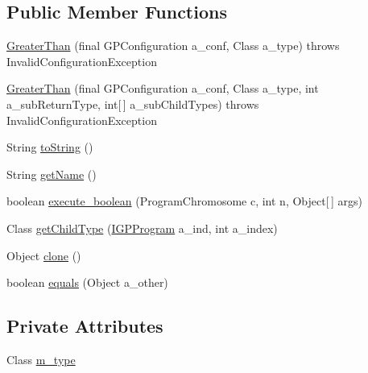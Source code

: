 \subsection*{Public Member Functions}
\begin{DoxyCompactItemize}
\item 
\hyperlink{classorg_1_1jgap_1_1gp_1_1function_1_1_greater_than_a917097bf9614d97706897533887ff9f0}{Greater\-Than} (final G\-P\-Configuration a\-\_\-conf, Class a\-\_\-type)  throws Invalid\-Configuration\-Exception 
\item 
\hyperlink{classorg_1_1jgap_1_1gp_1_1function_1_1_greater_than_a6901273979f00176acda4f5981f33b09}{Greater\-Than} (final G\-P\-Configuration a\-\_\-conf, Class a\-\_\-type, int a\-\_\-sub\-Return\-Type, int\mbox{[}$\,$\mbox{]} a\-\_\-sub\-Child\-Types)  throws Invalid\-Configuration\-Exception 
\item 
String \hyperlink{classorg_1_1jgap_1_1gp_1_1function_1_1_greater_than_a93a31532b674a66239530067abf457ce}{to\-String} ()
\item 
String \hyperlink{classorg_1_1jgap_1_1gp_1_1function_1_1_greater_than_adf5de34aea7c8dac2dfa33c187d632aa}{get\-Name} ()
\item 
boolean \hyperlink{classorg_1_1jgap_1_1gp_1_1function_1_1_greater_than_a30eb87fb0cf173cf8d980e80a21c415f}{execute\-\_\-boolean} (Program\-Chromosome c, int n, Object\mbox{[}$\,$\mbox{]} args)
\item 
Class \hyperlink{classorg_1_1jgap_1_1gp_1_1function_1_1_greater_than_a4843775224b4f1f9699fcd26c8bcb9fa}{get\-Child\-Type} (\hyperlink{interfaceorg_1_1jgap_1_1gp_1_1_i_g_p_program}{I\-G\-P\-Program} a\-\_\-ind, int a\-\_\-index)
\item 
Object \hyperlink{classorg_1_1jgap_1_1gp_1_1function_1_1_greater_than_aff23ed8d5593424801ec261b7bb05a62}{clone} ()
\item 
boolean \hyperlink{classorg_1_1jgap_1_1gp_1_1function_1_1_greater_than_a6eeaa8217a3c07102d3c0b9296abd2ce}{equals} (Object a\-\_\-other)
\end{DoxyCompactItemize}
\subsection*{Private Attributes}
\begin{DoxyCompactItemize}
\item 
Class \hyperlink{classorg_1_1jgap_1_1gp_1_1function_1_1_greater_than_adfeef436306aacd87bab46bcfbe2d390}{m\-\_\-type}
\end{DoxyCompactItemize}
